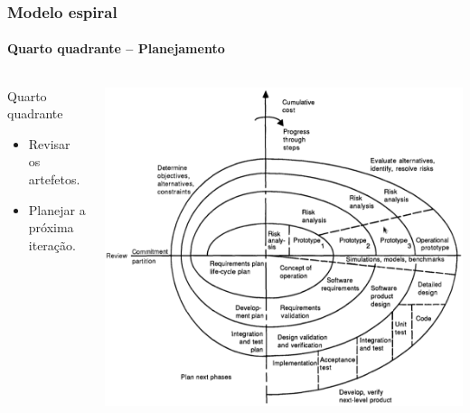 \begin{frame}
	\frametitle{Modelo espiral}
	\framesubtitle{Quarto quadrante -- Planejamento}

	\begin{columns}
		\begin{block:fact}{Quarto quadrante}
			\begin{itemize}
				\item Revisar os artefetos.
				\item Planejar a próxima iteração.
			\end{itemize}
		\end{block:fact}

		\begin{block:fact}{}
			\centering
			\includegraphics[width=\textwidth]{software-engineering/project-management/process/sdlc/spiral/spiral}
		\end{block:fact}
	\end{columns}
\end{frame}


